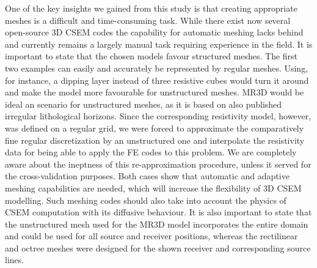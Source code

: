 \documentclass[
    paper,
  ]{geophysics}
\begin{document}
One of the key insights we gained from this study is that creating appropriate meshes is a difficult and time-consuming task. While there exist now several open-source 3D CSEM codes the capability for automatic meshing lacks behind and currently remains a largely manual task requiring experience in the field. It is important to state that the chosen models favour structured meshes. The first two examples can easily and accurately be represented by regular meshes. Using, for instance, a dipping layer instead of three resistive cubes would turn it around and make the model more favourable for unstructured meshes. MR3D would be ideal an scenario for unstructured meshes, as it is based on also published irregular lithological horizons. Since the corresponding resistivity model, however, was defined on a regular grid, we were forced to approximate the comparatively fine regular discretization by an unstructured one and interpolate the resistivity data for being able to apply the FE codes to this problem. We are completely aware about the ineptness of this re-approximation procedure, unless it served for the cross-validation purposes. Both cases show that automatic and adaptive meshing capabilities are needed, which will increase the flexibility of 3D CSEM modelling. Such meshing codes should also take into account the physics of CSEM computation with its diffusive behaviour. It is also important to state that the unstructured mesh used for the MR3D model incorporates the entire domain and could be used for all source and receiver positions, whereas the rectilinear and octree meshes were designed for the shown receiver and corresponding source lines.
\end{document}
